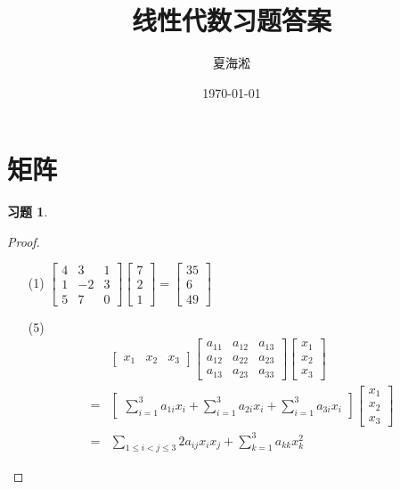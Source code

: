 \documentclass{ctexart}
\author{夏海淞}
\title{线性代数习题答案}
\date{\today}
\newtheorem{problem}{习题}[section]
\begin{document}
\maketitle
\tableofcontents

\clearpage
\section{矩阵}

\begin{problem}
\end{problem}
\begin{proof}
    \begin{enumerate}
        \item[(1)] \(\begin{bmatrix}
                4 & 3 & 1 \\1&-2&3\\5&7&0
            \end{bmatrix}\begin{bmatrix}
                7 \\2\\1
            \end{bmatrix}=\begin{bmatrix}
                35 \\6\\49
            \end{bmatrix}\)
        \item[(5)]
            \begin{align*}
                  & \begin{bmatrix}
                    x_1 & x_2 & x_3
                \end{bmatrix}
                \begin{bmatrix}
                    a_{11} & a_{12} & a_{13} \\
                    a_{12} & a_{22} & a_{23} \\
                    a_{13} & a_{23} & a_{33}
                \end{bmatrix}
                \begin{bmatrix}
                    x_1 \\x_2\\x_3
                \end{bmatrix}                                                 \\
                = & \begin{bmatrix}\sum_{i=1}^3a_{1i}x_i+\sum_{i=1}^3a_{2i}x_i+\sum_{i=1}^3a_{3i}x_i\end{bmatrix}
                \begin{bmatrix}x_1 \\x_2 \\x_3\end{bmatrix}                                                 \\
                = & \sum_{1 \leq i<j \leq 3} 2 a_{i j} x_i x_j+\sum_{k=1}^3 a_{k k} x_k^2
            \end{align*}

    \end{enumerate}
\end{proof}
\end{document}
